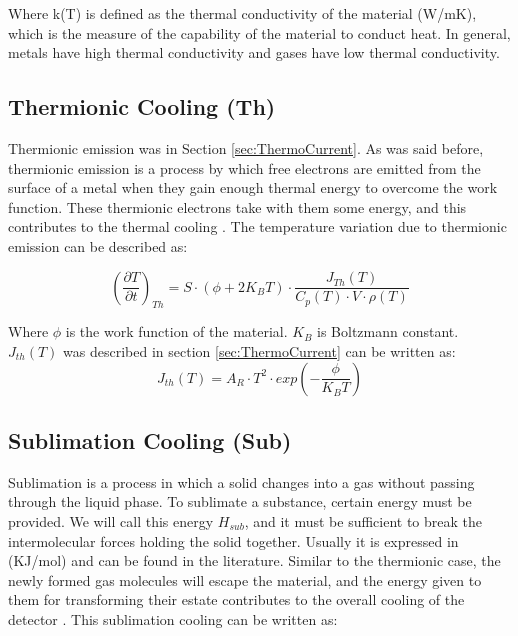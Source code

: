 Where k(T) is defined as the thermal conductivity of the material (W/mK), which is the measure of the capability of the material to conduct heat. In general, metals have high thermal conductivity and gases have low thermal conductivity. 

\subsection{Thermionic Cooling (Th)}
\label{sec:ThermionicCooling}

Thermionic emission was in Section \ref{sec:ThermoCurrent}. As was said before, thermionic emission is a process by which free electrons are emitted from the surface of a metal when they gain enough thermal energy to overcome the work function. These thermionic electrons take with them some energy, and this contributes to the thermal cooling \parencite[][]{ref:ThermoCooling}. The temperature variation due to thermionic emission can be described as: 

\begin{equation}
    \left(\frac{\partial T}{\partial t}\right)_{Th} = S\cdot \left( \phi +2K_B T\right)\cdot \frac{J_{Th}(T)}{C_p(T)\cdot V \cdot \rho(T)}
\end{equation}

Where $\phi$ is the work function of the material. $K_B$ is Boltzmann constant. $J_{th} (T)$ was described in section \ref{sec:ThermoCurrent} can be written as: 
\begin{equation}
    J_{th} (T) = A_R \cdot T^2\cdot exp\left(-\frac{\phi}{K_B T}\right)
\end{equation}

\subsection{Sublimation Cooling (Sub)}
\label{sec:SublimationCooling}

Sublimation is a process in which a solid changes into a gas without passing through the liquid phase. To sublimate a substance, certain energy must be provided. We will call this energy $H_{sub}$, and it must be sufficient to break the intermolecular forces holding the solid together. Usually it is expressed in (KJ/mol) and can be found in the literature. Similar to the thermionic case, the newly formed gas molecules will escape the material, and the energy given to them for transforming their estate contributes to the overall cooling of the detector \parencite[][]{ref:SublimationCooling}. This sublimation cooling can be written as: 

